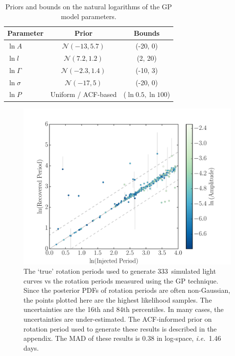 \documentclass[useAMS, usenatbib, preprint, 12pt]{aastex}
\newcommand{\ie}{{\it i.e.}}
\newcommand{\naigrain}{333}
\begin{document}
\begin{table}
\begin{center}
\caption{Priors and bounds on the natural logarithms of the GP model
    parameters.}
\begin{tabular}{lcc}
Parameter & Prior & Bounds\\
    \hline
    $\ln A$ & $\mathcal N(-13, 5.7)$ & (-20, 0) \\
    $\ln l$ & $\mathcal N(7.2, 1.2)$ & (2, 20) \\
    $\ln \Gamma$ & $\mathcal N(-2.3, 1.4)$ & (-10, 3) \\
    $\ln \sigma$ & $\mathcal N(-17, 5)$ & (-20, 0) \\
    $\ln P $ & Uniform / ACF-based & ($\ln 0.5, \ln 100$) \\
\end{tabular}
\end{center}
\end{table}
\label{tab:priors}

\begin{figure}
\begin{center}
\includegraphics[width=6in, clip=true]{figures/comparison_acfprior_02_03.pdf}
\caption{The `true' rotation periods used to generate \naigrain\
simulated light curves vs the rotation periods measured using the GP
technique.
Since the posterior PDFs of rotation periods are often non-Gaussian,
the points plotted here are the highest likelihood samples.
The uncertainties are the 16th and 84th percentiles.
In many cases, the uncertainties are under-estimated.
The ACF-informed prior on rotation period used to generate these results is
    described in the appendix.
The MAD of these results is 0.38 in log-space, \ie\ 1.46 days.
    }
\label{fig:compare_mcmc_acfprior}
\end{center}
\end{figure}
\end{document}
